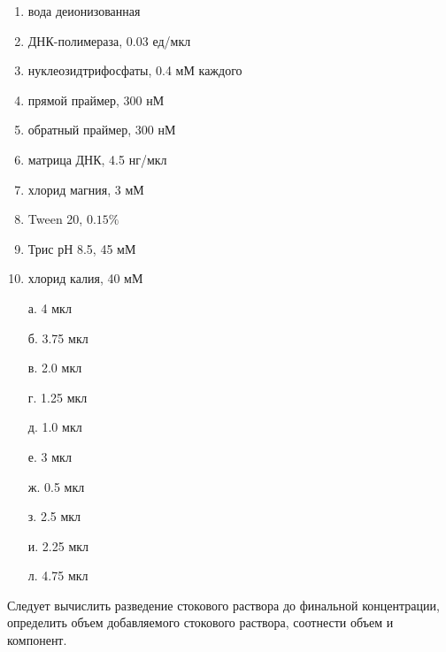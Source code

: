\begin{multicols}{2}
    {
        \begin{enumerate}
            \item вода деионизованная
            \item ДНК-полимераза, 0.03 ед/мкл
            \item нуклеозидтрифосфаты, 0.4 мМ каждого
            \item прямой праймер, 300 нМ
            \item обратный праймер, 300 нМ
            \item матрица ДНК, 4.5 нг/мкл
            \item хлорид магния, 3 мМ
            \item Tween 20, $0.15\%$
            \item Трис рН 8.5, 45 мМ
            \item хлорид калия, 40 мМ
        \end{enumerate}
    }
    {
        \begin{enumerate}
            \item[а.] 4 мкл
            \item[б.] 3.75 мкл
            \item[в.] 2.0 мкл
            \item[г.] 1.25 мкл
            \item[д.] 1.0 мкл
            \item[е.] 3 мкл
            \item[ж.] 0.5 мкл
            \item[з.] 2.5 мкл
            \item[и.] 2.25 мкл
            \item[л.] 4.75 мкл
        \end{enumerate}
    }
\end{multicols}

\explanationSection

Следует вычислить разведение стокового раствора до финальной концентрации, определить объем добавляемого стокового раствора, соотнести объем и компонент.

